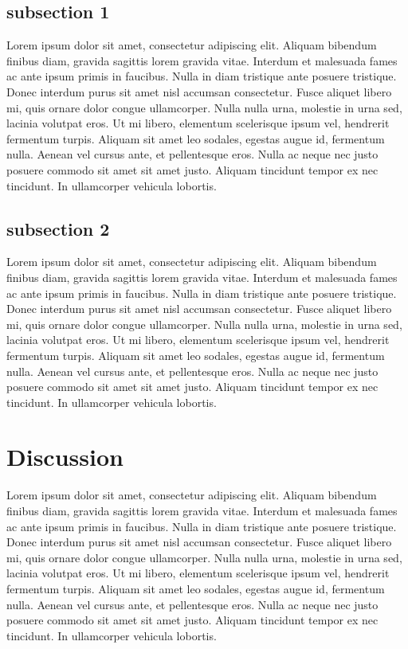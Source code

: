 \documentclass[10pt,letterpaper,twocolumn]{article}
\begin{document}
\subsection*{subsection 1}
Lorem ipsum dolor sit amet, consectetur adipiscing elit. Aliquam bibendum
finibus diam, gravida sagittis lorem gravida vitae. Interdum et malesuada fames
ac ante ipsum primis in faucibus. Nulla in diam tristique ante posuere
tristique. Donec interdum purus sit amet nisl accumsan consectetur. Fusce
aliquet libero mi, quis ornare dolor congue ullamcorper. Nulla nulla urna,
molestie in urna sed, lacinia volutpat eros. Ut mi libero, elementum scelerisque
ipsum vel, hendrerit fermentum turpis. Aliquam sit amet leo sodales, egestas
augue id, fermentum nulla. Aenean vel cursus ante, et pellentesque eros. Nulla
ac neque nec justo posuere commodo sit amet sit amet justo. Aliquam tincidunt
tempor ex nec tincidunt. In ullamcorper vehicula lobortis.

\subsection*{subsection 2}
Lorem ipsum dolor sit amet, consectetur adipiscing elit. Aliquam bibendum
finibus diam, gravida sagittis lorem gravida vitae. Interdum et malesuada fames
ac ante ipsum primis in faucibus. Nulla in diam tristique ante posuere
tristique. Donec interdum purus sit amet nisl accumsan consectetur. Fusce
aliquet libero mi, quis ornare dolor congue ullamcorper. Nulla nulla urna,
molestie in urna sed, lacinia volutpat eros. Ut mi libero, elementum scelerisque
ipsum vel, hendrerit fermentum turpis. Aliquam sit amet leo sodales, egestas
augue id, fermentum nulla. Aenean vel cursus ante, et pellentesque eros. Nulla
ac neque nec justo posuere commodo sit amet sit amet justo. Aliquam tincidunt
tempor ex nec tincidunt. In ullamcorper vehicula lobortis.

\section*{Discussion}

Lorem ipsum dolor sit amet, consectetur adipiscing elit. Aliquam bibendum
finibus diam, gravida sagittis lorem gravida vitae. Interdum et malesuada fames
ac ante ipsum primis in faucibus. Nulla in diam tristique ante posuere
tristique. Donec interdum purus sit amet nisl accumsan consectetur. Fusce
aliquet libero mi, quis ornare dolor congue ullamcorper. Nulla nulla urna,
molestie in urna sed, lacinia volutpat eros. Ut mi libero, elementum scelerisque
ipsum vel, hendrerit fermentum turpis. Aliquam sit amet leo sodales, egestas
augue id, fermentum nulla. Aenean vel cursus ante, et pellentesque eros. Nulla
ac neque nec justo posuere commodo sit amet sit amet justo. Aliquam tincidunt
tempor ex nec tincidunt. In ullamcorper vehicula lobortis.



\end{document}
